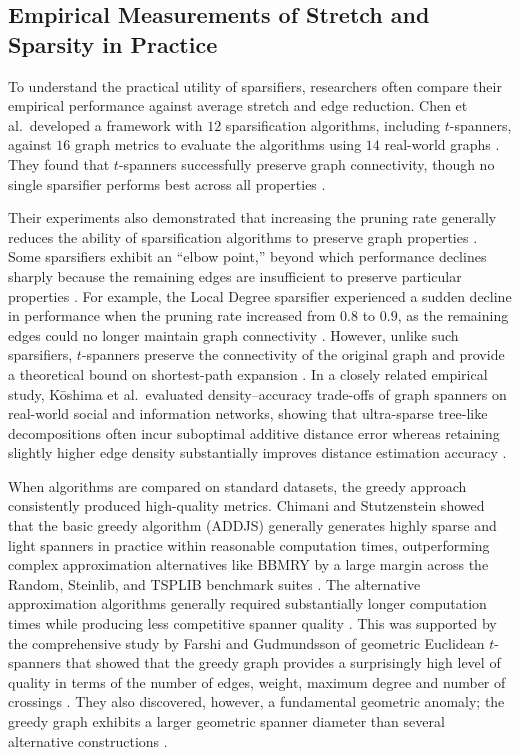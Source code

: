 \documentclass[conference]{IEEEtran}
\begin{document}
\subsection{Empirical Measurements of Stretch and Sparsity in Practice}
To understand the practical utility of sparsifiers, researchers often compare their empirical performance against average stretch and edge reduction. Chen et al.\ developed a framework with $12$ sparsification algorithms, including $t$-spanners, against $16$ graph metrics to evaluate the algorithms using $14$ real-world graphs \cite{ref1}. They found that $t$-spanners successfully preserve graph connectivity, though no single sparsifier performs best across all properties \cite{ref1}.

Their experiments also demonstrated that increasing the pruning rate generally reduces the ability of sparsification algorithms to preserve graph properties \cite{ref1}. Some sparsifiers exhibit an ``elbow point,'' beyond which performance declines sharply because the remaining edges are insufficient to preserve particular properties \cite{ref1}. For example, the Local Degree sparsifier experienced a sudden decline in performance when the pruning rate increased from $0.8$ to $0.9$, as the remaining edges could no longer maintain graph connectivity \cite{ref1}. However, unlike such sparsifiers, $t$-spanners preserve the connectivity of the original graph and provide a theoretical bound on shortest-path expansion \cite{ref1, ref4}. In a closely related empirical study, K\={o}shima et al.\ evaluated density--accuracy trade-offs of graph spanners on real-world social and information networks, showing that ultra-sparse tree-like decompositions often incur suboptimal additive distance error whereas retaining slightly higher edge density substantially improves distance estimation accuracy \cite{ref20}.

When algorithms are compared on standard datasets, the greedy approach consistently produced high-quality metrics. Chimani and Stutzenstein showed that the basic greedy algorithm (ADDJS) generally generates highly sparse and light spanners in practice within reasonable computation times, outperforming complex approximation alternatives like BBMRY by a large margin across the Random, Steinlib, and TSPLIB benchmark suites \cite{ref21}. The alternative approximation algorithms generally required substantially longer computation times while producing less competitive spanner quality \cite{ref21}. This was supported by the comprehensive study by Farshi and Gudmundsson of geometric Euclidean $t$-spanners that showed that the greedy graph provides a surprisingly high level of quality in terms of the number of edges, weight, maximum degree and number of crossings \cite{ref8, ref9}. They also discovered, however, a fundamental geometric anomaly; the greedy graph exhibits a larger geometric spanner diameter than several alternative constructions \cite{ref9}.
\end{document}
